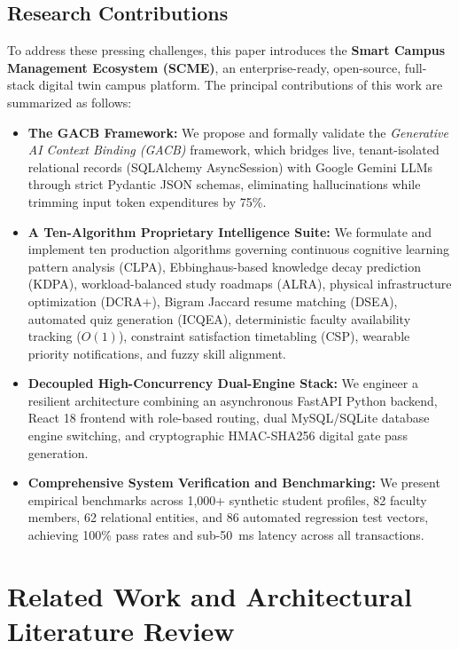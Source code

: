 \documentclass[11pt,a4paper]{article}
\begin{document}
\subsection{Research Contributions}
To address these pressing challenges, this paper introduces the \textbf{Smart Campus Management Ecosystem (SCME)}, an enterprise-ready, open-source, full-stack digital twin campus platform. The principal contributions of this work are summarized as follows:
\begin{itemize}
    \item \textbf{The GACB Framework:} We propose and formally validate the \emph{Generative AI Context Binding (GACB)} framework, which bridges live, tenant-isolated relational records (SQLAlchemy AsyncSession) with Google Gemini LLMs through strict Pydantic JSON schemas, eliminating hallucinations while trimming input token expenditures by 75\%.
    \item \textbf{A Ten-Algorithm Proprietary Intelligence Suite:} We formulate and implement ten production algorithms governing continuous cognitive learning pattern analysis (CLPA), Ebbinghaus-based knowledge decay prediction (KDPA), workload-balanced study roadmaps (ALRA), physical infrastructure optimization (DCRA+), Bigram Jaccard resume matching (DSEA), automated quiz generation (ICQEA), deterministic faculty availability tracking ($O(1)$), constraint satisfaction timetabling (CSP), wearable priority notifications, and fuzzy skill alignment.
    \item \textbf{Decoupled High-Concurrency Dual-Engine Stack:} We engineer a resilient architecture combining an asynchronous FastAPI Python backend, React 18 frontend with role-based routing, dual MySQL/SQLite database engine switching, and cryptographic HMAC-SHA256 digital gate pass generation.
    \item \textbf{Comprehensive System Verification and Benchmarking:} We present empirical benchmarks across 1,000+ synthetic student profiles, 82 faculty members, 62 relational entities, and 86 automated regression test vectors, achieving 100\% pass rates and sub-50~ms latency across all transactions.
\end{itemize}

\section{Related Work and Architectural Literature Review}
\label{sec:lit_review}
\end{document}
